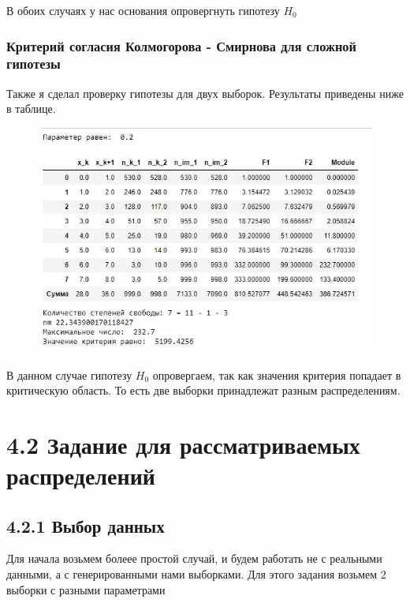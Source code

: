 \documentclass[a4paper,12pt, oneside]{book}
\begin{document}
В обоих случаях у нас основания опровергнуть гипотезу $ H_0 $


\subsection{Критерий согласия Колмогорова - Смирнова для сложной гипотезы}

Также я сделал проверку гипотезы для двух выборок. Результаты приведены ниже в таблице. 
\begin{figure}[h!]
	\begin{center}
		\begin{minipage}[h]{0.47\linewidth}
			{\includegraphics[width=1.5\linewidth]{fotos/kolmogor/tr}}\\
		\end{minipage}
	\end{center}
\end{figure}

В данном случае гипотезу $ H_0 $ опровергаем, так как значения критерия попадает в критическую область. То есть две выборки принадлежат разным распределениям.

\chapter{4.2 Задание для рассматриваемых распределений}


\section{4.2.1 Выбор данных}
	Для начала возьмем болеее простой случай, и будем работать не с реальными данными, а с генерированными нами  выборками. Для этого задания возьмем 2 выборки с разными параметрами
\end{document}
